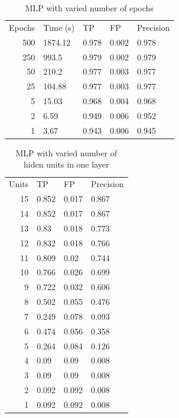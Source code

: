 \documentclass[10pt]{article}
\begin{document}
      \begin{table}
        \centering
        \begin{tabular}{ | r | l | l | l | l | }
          \hline
          Epochs & Time (s) & TP    & FP    & Precision \\ \hhline{|=|=|=|=|=|}
          500    & 1874.12  & 0.978 & 0.002 & 0.978     \\ \hline
          250    & 993.5    & 0.979 & 0.002 & 0.979     \\ \hline
          50     & 210.2    & 0.977 & 0.003 & 0.977     \\ \hline
          25     & 104.88   & 0.977 & 0.003 & 0.977     \\ \hline
          5      & 15.03    & 0.968 & 0.004 & 0.968     \\ \hline
          2      & 6.59     & 0.949 & 0.006 & 0.952     \\ \hline
          1      & 3.67     & 0.943 & 0.006 & 0.945     \\ \hline
        \end{tabular}

        \caption{MLP with varied number of epochs}
        \label{table:mlpEpochTest}
      \end{table}

      \begin{table}
        \centering
        \begin{tabular}{ | r | l | l | l | }
          \hline
          Units & TP & FP & Precision \\ \hhline{|=|=|=|=|}
          15 & 0.852 & 0.017 & 0.867  \\ \hline
          14 & 0.852 & 0.017 & 0.867  \\ \hline
          13 & 0.83  & 0.018 & 0.773  \\ \hline
          12 & 0.832 & 0.018 & 0.766  \\ \hline
          11 & 0.809 & 0.02  & 0.744  \\ \hline
          10 & 0.766 & 0.026 & 0.699  \\ \hline
          9 & 0.722  & 0.032 & 0.606  \\ \hline
          8 & 0.502  & 0.055 & 0.476  \\ \hline
          7 & 0.249  & 0.078 & 0.093  \\ \hline
          6 & 0.474  & 0.056 & 0.358  \\ \hline
          5 & 0.264  & 0.084 & 0.126  \\ \hline
          4 & 0.09   & 0.09  & 0.008  \\ \hline
          3 & 0.09   & 0.09  & 0.008  \\ \hline
          2 & 0.092  & 0.092 & 0.008  \\ \hline
          1 & 0.092  & 0.092 & 0.008  \\ \hline
        \end{tabular}

        \caption{MLP with varied number of hiden units in one layer}
        \label{table:mlpHiddenLayerTest}
      \end{table}
\end{document}
